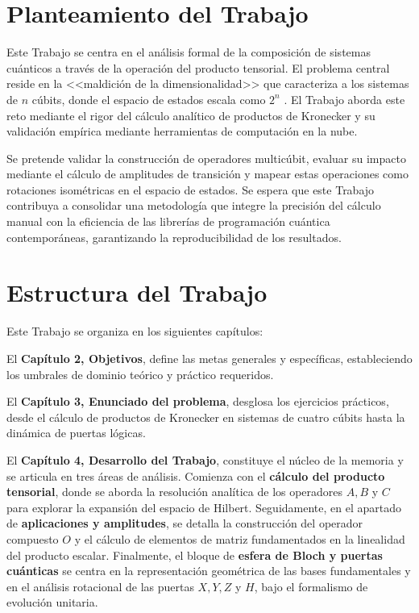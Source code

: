 \documentclass[11pt,a4paper,spanish]{book}
\begin{document}
\section{Planteamiento del Trabajo}

Este Trabajo se centra en el análisis formal de la composición de sistemas cuánticos a través de la operación del producto tensorial. El problema central reside en la <<maldición de la dimensionalidad>> que caracteriza a los sistemas de $n$ cúbits, donde el espacio de estados escala como $2^n$ \citep{nielsen2010}. El Trabajo aborda este reto mediante el rigor del cálculo analítico de productos de Kronecker y su validación empírica mediante herramientas de computación en la nube.

Se pretende validar la construcción de operadores multicúbit, evaluar su impacto mediante el cálculo de amplitudes de transición y mapear estas operaciones como rotaciones isométricas en el espacio de estados. Se espera que este Trabajo contribuya a consolidar una metodología que integre la precisión del cálculo manual con la eficiencia de las librerías de programación cuántica contemporáneas, garantizando la reproducibilidad de los resultados.

\section{Estructura del Trabajo}

Este Trabajo se organiza en los siguientes capítulos:

El \textbf{Capítulo 2, Objetivos}, define las metas generales y específicas, estableciendo los umbrales de dominio teórico y práctico requeridos.

El \textbf{Capítulo 3, Enunciado del problema}, desglosa los ejercicios prácticos, desde el cálculo de productos de Kronecker en sistemas de cuatro cúbits hasta la dinámica de puertas lógicas. 

El \textbf{Capítulo 4, Desarrollo del Trabajo}, constituye el núcleo de la memoria y se articula en tres áreas de análisis. Comienza con el \textbf{cálculo del producto tensorial}, donde se aborda la resolución analítica de los operadores $A, B$ y $C$ para explorar la expansión del espacio de Hilbert. Seguidamente, en el apartado de \textbf{aplicaciones y amplitudes}, se detalla la construcción del operador compuesto $O$ y el cálculo de elementos de matriz fundamentados en la linealidad del producto escalar. Finalmente, el bloque de \textbf{esfera de Bloch y puertas cuánticas} se centra en la representación geométrica de las bases fundamentales y en el análisis rotacional de las puertas $X, Y, Z$ y $H$, bajo el formalismo de evolución unitaria.
\end{document}
